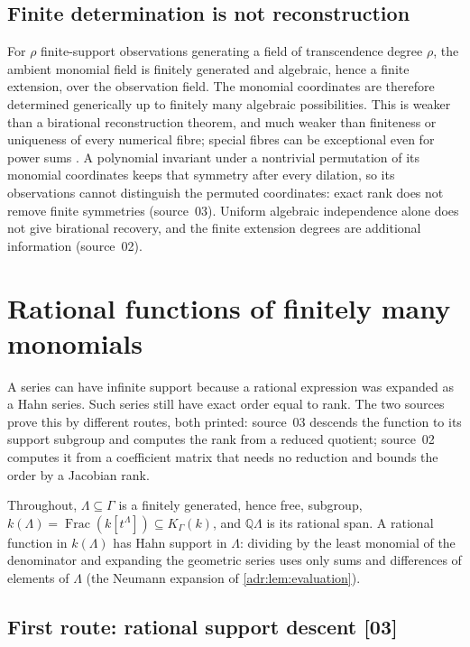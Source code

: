 \documentclass[11pt,letterpaper]{article}
\numberwithin{equation}{section}
\theoremstyle{definition}
\theoremstyle{remark}
\newcommand{\Q}{\mathbb Q}
\newcommand{\K}{K_\Gamma(k)}
\newcommand{\src}[1]{\textup{[#1]}}%
\begin{document}
\subsection{Finite determination is not reconstruction}
\label{adr:sr:sec:reconstruction}

For $\rho$ finite-support observations generating a field of transcendence
degree $\rho$, the ambient monomial field is finitely generated and algebraic,
hence a finite extension, over the observation field. The monomial coordinates
are therefore determined generically up to finitely many algebraic
possibilities. This is weaker than a birational reconstruction theorem, and
much weaker than finiteness or uniqueness of every numerical fibre; special
fibres can be exceptional even for power sums \cite{MSW}. A polynomial
invariant under a nontrivial permutation of its monomial coordinates keeps
that symmetry after every dilation, so its observations cannot distinguish the
permuted coordinates: exact rank does not remove finite symmetries
(source~03). Uniform algebraic independence alone does not give birational
recovery, and the finite extension degrees are additional information
(source~02).

\section{Rational functions of finitely many monomials}
\label{adr:sr:sec:rational}

A series can have infinite support because a rational expression was expanded
as a Hahn series. Such series still have exact order equal to rank. The two
sources prove this by different routes, both printed: source~03 descends the
function to its support subgroup and computes the rank from a reduced
quotient; source~02 computes it from a coefficient matrix that needs no
reduction and bounds the order by a Jacobian rank.

Throughout, $\Lambda\subseteq\Gamma$ is a finitely generated, hence free,
subgroup, $k(\Lambda)=\operatorname{Frac}(k[t^\Lambda])\subseteq\K$, and
$\Q\Lambda$ is its rational span. A rational function in $k(\Lambda)$ has Hahn
support in $\Lambda$: dividing by the least monomial of the denominator and
expanding the geometric series uses only sums and differences of elements of
$\Lambda$ (the Neumann expansion of \cref{adr:lem:evaluation}).

\subsection{First route: rational support descent \src{03}}
\end{document}
